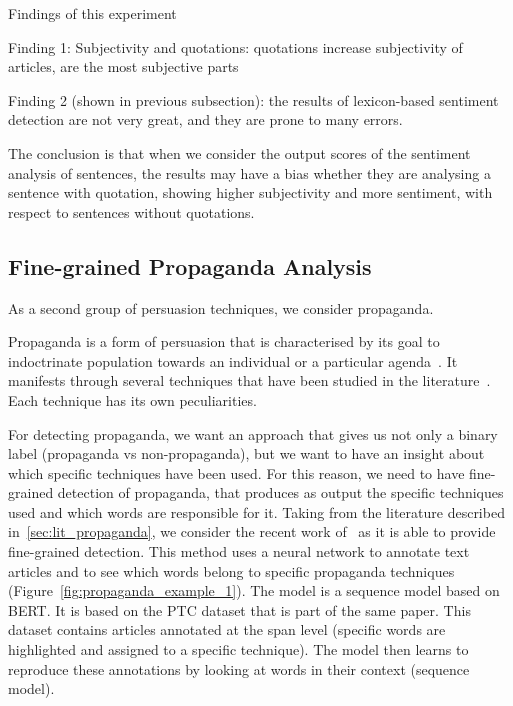 
Findings of this experiment

Finding 1:
Subjectivity and quotations: quotations increase subjectivity of articles, are the most subjective parts

Finding 2 (shown in previous subsection): the results of lexicon-based sentiment detection are not very great, and they are prone to many errors.


The conclusion is that when we consider the output scores of the sentiment analysis of sentences, the results may have a bias whether they are analysing a sentence with quotation, showing higher subjectivity and more sentiment, with respect to sentences without quotations.

\subsection{\statusorange Fine-grained Propaganda Analysis}
\label{ssec:lp_techniques_propaganda}

As a second group of persuasion techniques, we consider \gls{propaganda}.

Propaganda is a form of persuasion that is characterised by its goal to indoctrinate population towards an individual or a particular agenda~\citep{bernays}.
It manifests through several techniques that have been studied in the literature~\citep{torok2015symbiotic}. Each technique has its own peculiarities.

For detecting propaganda, we want an approach that gives us not only a binary label (propaganda vs non-propaganda), but we want to have an insight about which specific techniques have been used. For this reason, we need to have fine-grained detection of propaganda, that produces as output the specific techniques used and which words are responsible for it.
Taking from the literature described in~\ref{sec:lit_propaganda}, we consider the recent work of~\cite{da2019fine} as it is able to provide fine-grained detection. This method uses a neural network to annotate text articles and to see which words belong to specific propaganda techniques (Figure~\ref{fig:propaganda_example_1}).
The model is a sequence model based on BERT. It is based on the PTC dataset that is part of the same paper. This dataset contains articles annotated at the span level (specific words are highlighted and assigned to a specific technique). The model then learns to reproduce these annotations by looking at words in their context (sequence model).

